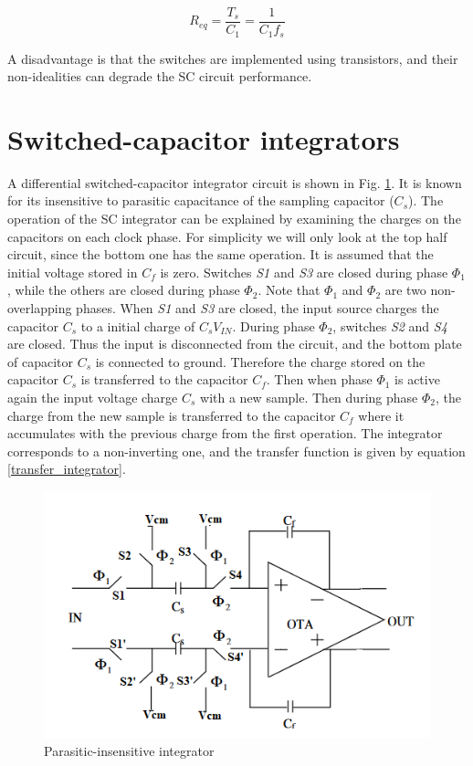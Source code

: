 \begin{equation}
    R_{eq} = \frac{T_s}{C_1} = \frac{1}{C_1f_s}
\end{equation}

A disadvantage is that the switches are implemented using transistors, and their non-idealities can degrade the SC circuit performance. 

\section{Switched-capacitor integrators}
A differential switched-capacitor integrator circuit is shown in Fig. \ref{fig:DT_integrator}. It is known for its insensitive to parasitic capacitance of the sampling capacitor ($C_s$). The operation of the SC integrator can be explained by examining the charges on the capacitors on each clock phase. For simplicity we will only look at the top half circuit, since the bottom one has the same operation. It is assumed that the initial voltage stored in $C_f$ is zero. Switches \textit{S1} and \textit{S3} are closed during phase $\Phi_1$, while the others are closed during phase $\Phi_2$. Note that $\Phi_1$ and $\Phi_2$ are two non-overlapping phases. When \textit{S1} and \textit{S3} are closed, the input source charges the capacitor $C_s$ to a initial charge of $C_sV_{IN}$. During phase $\Phi_2$, switches \textit{S2} and \textit{S4} are closed. Thus the input is disconnected from the circuit, and the bottom plate of capacitor $C_s$ is connected to ground. Therefore the charge stored on the capacitor $C_s$ is transferred to the capacitor $C_f$. Then when phase $\Phi_1$ is active again the input voltage charge $C_s$ with a new sample. Then during phase $\Phi_2$, the charge from the new sample is transferred to the capacitor $C_f$ where it accumulates with the previous charge from the first operation. The integrator corresponds to a non-inverting one, and the transfer function is given by equation \ref{transfer_integrator}.

\begin{figure}[h]
\centering
\includegraphics[scale=0.8]{images/DT_integrator.png}
\caption{Parasitic-insensitive integrator}
\label{fig:DT_integrator}
\end{figure}


